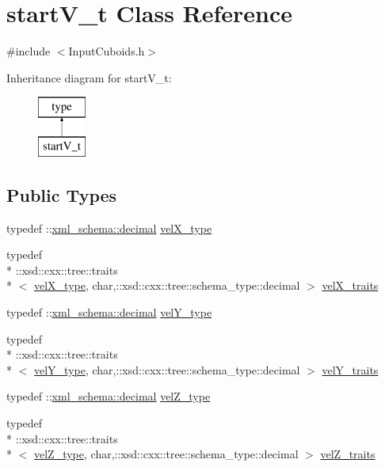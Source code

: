 \hypertarget{classstartV__t}{\section{start\-V\-\_\-t Class Reference}
\label{classstartV__t}
}


{\ttfamily \#include $<$Input\-Cuboids.\-h$>$}

Inheritance diagram for start\-V\-\_\-t\-:\begin{figure}[H]
\begin{center}
\leavevmode
\includegraphics[height=2.000000cm]{classstartV__t}
\end{center}
\end{figure}
\subsection*{Public Types}
\begin{DoxyCompactItemize}
\item 
typedef \-::\hyperlink{namespacexml__schema_a69bfaf24f63a8c18ebd8e21db6b343df}{xml\-\_\-schema\-::decimal} \hyperlink{classstartV__t_aac8a2d74e6be7ae3248ba26d253ad3fc}{vel\-X\-\_\-type}
\item 
typedef \\*
\-::xsd\-::cxx\-::tree\-::traits\\*
$<$ \hyperlink{classstartV__t_aac8a2d74e6be7ae3248ba26d253ad3fc}{vel\-X\-\_\-type}, char,\-::xsd\-::cxx\-::tree\-::schema\-\_\-type\-::decimal $>$ \hyperlink{classstartV__t_aee57fb6e5210e3f5cdb037863d901086}{vel\-X\-\_\-traits}
\item 
typedef \-::\hyperlink{namespacexml__schema_a69bfaf24f63a8c18ebd8e21db6b343df}{xml\-\_\-schema\-::decimal} \hyperlink{classstartV__t_acfa8dd01ff687d610335845945099743}{vel\-Y\-\_\-type}
\item 
typedef \\*
\-::xsd\-::cxx\-::tree\-::traits\\*
$<$ \hyperlink{classstartV__t_acfa8dd01ff687d610335845945099743}{vel\-Y\-\_\-type}, char,\-::xsd\-::cxx\-::tree\-::schema\-\_\-type\-::decimal $>$ \hyperlink{classstartV__t_a004e9fe52571fa7204d075feb71c244e}{vel\-Y\-\_\-traits}
\item 
typedef \-::\hyperlink{namespacexml__schema_a69bfaf24f63a8c18ebd8e21db6b343df}{xml\-\_\-schema\-::decimal} \hyperlink{classstartV__t_ae49f578f0cc0d86f126691188752dfe9}{vel\-Z\-\_\-type}
\item 
typedef \\*
\-::xsd\-::cxx\-::tree\-::traits\\*
$<$ \hyperlink{classstartV__t_ae49f578f0cc0d86f126691188752dfe9}{vel\-Z\-\_\-type}, char,\-::xsd\-::cxx\-::tree\-::schema\-\_\-type\-::decimal $>$ \hyperlink{classstartV__t_ab8922309ab467a161007402cf39c89e5}{vel\-Z\-\_\-traits}
\end{DoxyCompactItemize}
